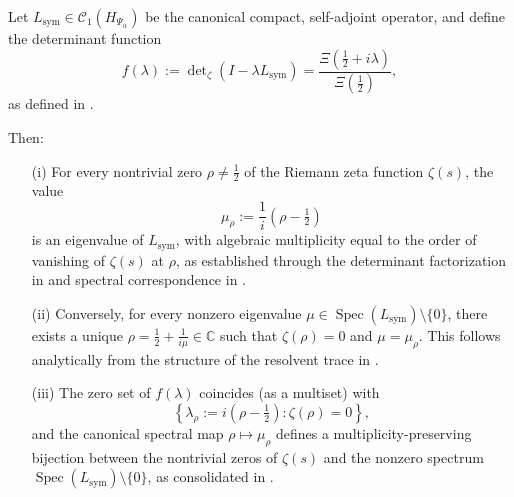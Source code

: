 \begin{lemma}
\label{lem:fredholm_zero_spectral_map}
Let \( L_{\mathrm{sym}} \in \mathcal{C}_1(H_{\Psi_\alpha}) \) be the canonical compact, self-adjoint operator, and define the determinant function
\[
f(\lambda) := \det\nolimits_\zeta(I - \lambda L_{\mathrm{sym}}) = \frac{\Xi\left( \tfrac{1}{2} + i\lambda \right)}{\Xi\left( \tfrac{1}{2} \right)},
\]
as defined in .

Then:
\begin{enumerate}
  \item[\textnormal{(i)}] For every nontrivial zero \( \rho \ne \tfrac{1}{2} \) of the Riemann zeta function \( \zeta(s) \), the value
  \[
  \mu_\rho := \frac{1}{i}(\rho - \tfrac{1}{2})
  \]
  is an eigenvalue of \( L_{\mathrm{sym}} \), with algebraic multiplicity equal to the order of vanishing of \( \zeta(s) \) at \( \rho \), as established through the determinant factorization in  and spectral correspondence in .

  \item[\textnormal{(ii)}] Conversely, for every nonzero eigenvalue \( \mu \in \operatorname{Spec}(L_{\mathrm{sym}}) \setminus \{0\} \), there exists a unique \( \rho = \tfrac{1}{2} + \frac{1}{i\mu} \in \mathbb{C} \) such that \( \zeta(\rho) = 0 \) and \( \mu = \mu_\rho \). This follows analytically from the structure of the resolvent trace in .

  \item[\textnormal{(iii)}] The zero set of \( f(\lambda) \) coincides (as a multiset) with
  \[
  \left\{ \lambda_\rho := i(\rho - \tfrac{1}{2}) : \zeta(\rho) = 0 \right\},
  \]
  and the canonical spectral map \( \rho \mapsto \mu_\rho \) defines a multiplicity-preserving bijection between the nontrivial zeros of \( \zeta(s) \) and the nonzero spectrum \( \operatorname{Spec}(L_{\mathrm{sym}}) \setminus \{0\} \), as consolidated in .
\end{enumerate}
\end{lemma}
